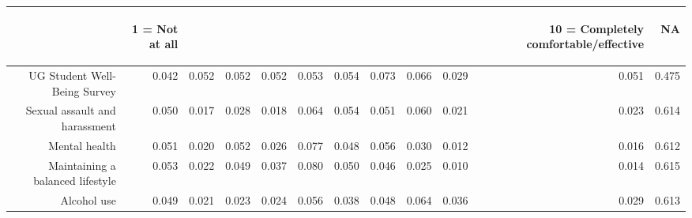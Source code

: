 \documentclass{article}\usepackage[]{graphicx}\usepackage[]{color}
\begin{document}
\begin{table}[ht]
\centering
\begin{tabular}{rrrrrrrrrrrr}
  \hline
 & \begin{sideways} 1 = Not at all \end{sideways} & \begin{sideways}   \end{sideways} & \begin{sideways}   \end{sideways} & \begin{sideways}   \end{sideways} & \begin{sideways}   \end{sideways} & \begin{sideways}   \end{sideways} & \begin{sideways}   \end{sideways} & \begin{sideways}   \end{sideways} & \begin{sideways}   \end{sideways} & \begin{sideways} 10 = Completely comfortable/effective \end{sideways} & \begin{sideways} NA \end{sideways} \\ 
  \hline
UG Student Well-Being Survey & 0.042 & 0.052 & 0.052 & 0.052 & 0.053 & 0.054 & 0.073 & 0.066 & 0.029 & 0.051 & 0.475 \\ 
  Sexual assault and harassment & 0.050 & 0.017 & 0.028 & 0.018 & 0.064 & 0.054 & 0.051 & 0.060 & 0.021 & 0.023 & 0.614 \\ 
  Mental health & 0.051 & 0.020 & 0.052 & 0.026 & 0.077 & 0.048 & 0.056 & 0.030 & 0.012 & 0.016 & 0.612 \\ 
  Maintaining a balanced lifestyle & 0.053 & 0.022 & 0.049 & 0.037 & 0.080 & 0.050 & 0.046 & 0.025 & 0.010 & 0.014 & 0.615 \\ 
  Alcohol use & 0.049 & 0.021 & 0.023 & 0.024 & 0.056 & 0.038 & 0.048 & 0.064 & 0.036 & 0.029 & 0.613 \\ 
   \hline
\end{tabular}
\end{table}
\end{document}
